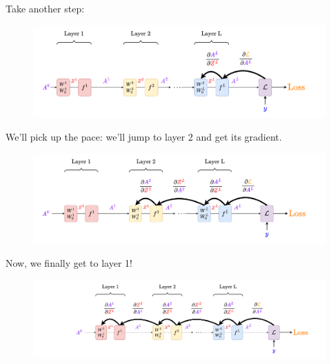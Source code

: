         Take another step:
        
        \begin{figure}[H]
            \centering
            \includegraphics[width=180mm,scale=0.4]{images/nn_1_5_images/network_bp_full2.png}
        \end{figure}
        
        We'll pick up the pace: we'll jump to layer 2 and get its gradient.
        
        \begin{figure}[H]
            \centering
            \includegraphics[width=180mm,scale=0.4]{images/nn_1_5_images/network_bp_full3.png}
        \end{figure}
        
        Now, we finally get to layer 1!
        
        \begin{figure}[H]
            \centering
            \includegraphics[width=180mm,scale=0.4]{images/nn_1_5_images/network_bp_full4.png}
        \end{figure}
        
